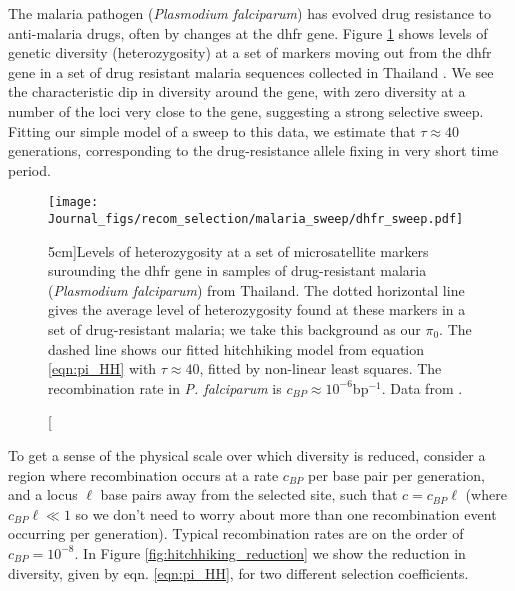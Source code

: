 The malaria pathogen ({\it Plasmodium falciparum}) has
evolved drug resistance to anti-malaria drugs, often by changes at
the dhfr gene. Figure \ref{fig:hitchhiking_malaria} shows levels of
genetic diversity (heterozygosity) at a set of markers moving out from the dhfr gene in a
set of  drug resistant malaria sequences collected in
Thailand \citep{nash2005selection}. We see the characteristic dip in diversity around the gene,
with zero diversity at a number of the loci very close to the gene,
suggesting a strong selective sweep. Fitting our simple model of a
sweep to this data,  we estimate that $\tau \approx 40$ generations,
corresponding to the drug-resistance allele fixing in very short time period. 

\begin{figure}
\begin{center}
\texttt{[image: Journal\_figs/recom\_selection/malaria\_sweep/dhfr\_sweep.pdf]}
\end{center}
\caption[][5cm]{Levels of heterozygosity at a set of microsatellite markers
  surounding the dhfr gene in samples of drug-resistant malaria ({\it Plasmodium falciparum}) from
  Thailand. The dotted horizontal line gives the average level of
  heterozygosity found at these markers in a set of drug-resistant
  malaria; we take this background as our $\pi_0$. The dashed line shows
  our fitted hitchhiking model from equation \ref{eqn:pi_HH} with $\tau \approx 40$, fitted by
  non-linear least squares. The recombination rate in {\it P.
    falciparum} is $c_{BP}\approx 10^{-6}$bp$^{-1}$. Data from
  \citet{nash2005selection}. } \label{fig:hitchhiking_malaria}
\end{figure}


To get a sense of the physical scale over which diversity is reduced,
consider a region where recombination occurs at a rate $c_{BP}$ per
base pair per generation, and a locus $ \ell $ base pairs away from the
selected site, such that $c=c_{BP } \ell $ (where $c_{BP}  \ell  \ll 1$ so we don't need to
worry about more than one recombination event occurring per
generation). Typical
recombination rates are on the order of $c_{BP} = 10^{-8}$. In Figure
\ref{fig:hitchhiking_reduction} we show the reduction in diversity,
given by eqn. \eqref{eqn:pi_HH}, for two different selection coefficients.\\ 


